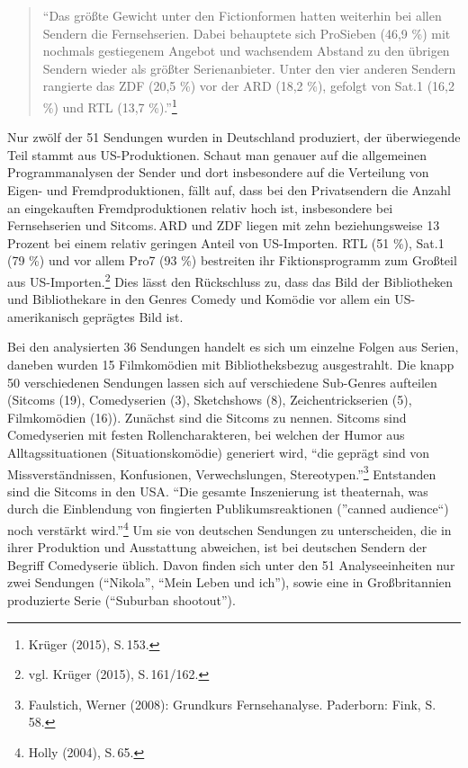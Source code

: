 \begin{flushleft}
\begin{quote}
\enquote{Das größte Gewicht unter den Fictionformen hatten weiterhin bei
allen Sendern die Fernsehserien. Dabei behauptete sich ProSieben (46,9
\%) mit nochmals gestiegenem Angebot und wachsendem Abstand zu den
übrigen Sendern wieder als größter Serienanbieter. Unter den vier
anderen Sendern rangierte das ZDF (20,5 \%) vor der ARD (18,2 \%),
gefolgt von Sat.1 (16,2 \%) und RTL (13,7 \%).}\footnote{Krüger (2015),
  S.\,153.}
\end{quote}
\end{flushleft}

Nur zwölf der 51 Sendungen wurden in Deutschland produziert, der
überwiegende Teil stammt aus US-Produktionen. Schaut man genauer auf die
allgemeinen Programmanalysen der Sender und dort insbesondere auf die
Verteilung von Eigen- und Fremdproduktionen, fällt auf, dass bei den
Privatsendern die Anzahl an eingekauften Fremdproduktionen relativ hoch
ist, insbesondere bei Fernsehserien und Sitcoms.\,ARD und ZDF liegen mit
zehn beziehungsweise 13 Prozent bei einem relativ geringen Anteil von
US-Importen. RTL (51 \%), Sat.1 (79 \%) und vor allem Pro7 (93 \%)
bestreiten ihr Fiktionsprogramm zum Großteil aus US-Importen.\footnote{vgl.
  Krüger (2015), S.\,161/162.} Dies lässt den Rückschluss zu, dass das
Bild der Bibliotheken und Bibliothekare in den Genres Comedy und Komödie
vor allem ein US-amerikanisch geprägtes Bild ist.

Bei den analysierten 36 Sendungen handelt es sich um einzelne Folgen aus
Serien, daneben wurden 15 Filmkomödien mit Bibliotheksbezug
ausgestrahlt. Die knapp 50 verschiedenen Sendungen lassen sich auf
verschiedene Sub-Genres aufteilen (Sitcoms (19), Comedyserien (3),
Sketchshows (8), Zeichentrickserien (5), Filmkomödien (16)). Zunächst
sind die Sitcoms zu nennen. Sitcoms sind Comedyserien mit festen
Rollencharakteren, bei welchen der Humor aus Alltagssituationen
(Situationskomödie) generiert wird, \enquote{die geprägt sind von
Missverständnissen, Konfusionen, Verwechslungen, Stereotypen.}\footnote{Faulstich,
  Werner (2008): Grundkurs Fernsehanalyse. Paderborn: Fink, S.\,58.}
Entstanden sind die Sitcoms in den USA. \enquote{Die gesamte
Inszenierung ist theaternah, was durch die Einblendung von fingierten
Publikumsreaktionen (}canned audience\enquote{) noch verstärkt
wird.}\footnote{Holly (2004), S.\,65.} Um sie von deutschen Sendungen zu
unterscheiden, die in ihrer Produktion und Ausstattung abweichen, ist
bei deutschen Sendern der Begriff Comedyserie üblich. Davon finden sich
unter den 51 Analyseeinheiten nur zwei Sendungen (\enquote{Nikola},
\enquote{Mein Leben und ich}), sowie eine in Großbritannien produzierte
Serie (\enquote{Suburban shootout}).

